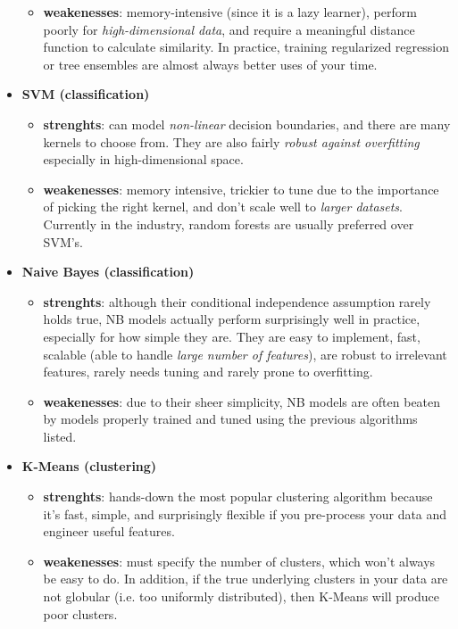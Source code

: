 \documentclass[11pt]{article}
\begin{document}
\begin{itemize}
\begin{itemize}
		\item \textbf{weakenesses}:  memory-intensive (since it is a lazy learner), perform poorly for \textit{high-dimensional data}, and require a meaningful distance function to calculate similarity. In practice, training regularized regression or tree ensembles are almost always better uses of your time.
	\end{itemize}
	\item \textbf{SVM (classification)}
	\begin{itemize}
		\item \textbf{strenghts}: can model \textit{non-linear} decision boundaries, and there are many kernels to choose from. They are also fairly\textit{ robust against overfitting} especially in high-dimensional space.
		\item \textbf{weakenesses}:  memory intensive, trickier to tune due to the importance of picking the right kernel, and don't scale well to \textit{larger datasets}. Currently in the industry, random forests are usually preferred over SVM's.
	\end{itemize}
	\item \textbf{Naive Bayes (classification)}
	\begin{itemize}
		\item \textbf{strenghts}: although their conditional independence assumption rarely holds true, NB models actually perform surprisingly well in practice, especially for how simple they are. They are easy to implement, fast, scalable  (able to handle \textit{large number of features}), are robust to irrelevant features, rarely needs tuning and rarely prone to overfitting.
		\item \textbf{weakenesses}:  due to their sheer simplicity, NB models are often beaten by models properly trained and tuned using the previous algorithms listed.
	\end{itemize}
	\item \textbf{K-Means (clustering)}
	\begin{itemize}
		\item \textbf{strenghts}: hands-down the most popular clustering algorithm because it's fast, simple, and surprisingly flexible if you pre-process your data and engineer useful features.
		\item \textbf{weakenesses}:  must specify the number of clusters, which won't always be easy to do. In addition, if the true underlying clusters in your data are not globular (i.e. too uniformly distributed), then K-Means will produce poor clusters.

\end{itemize}
\end{itemize}
\end{document}
